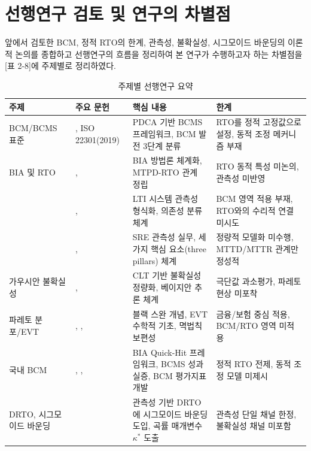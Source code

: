 

\section{선행연구 검토 및 연구의 차별점}
\label{sec:lit-gap}

앞에서 검토한 BCM, 정적 RTO의 한계, 관측성, 불확실성, 시그모이드 바운딩의 이론적 논의를 종합하고 선행연구의 흐름을 정리하여 본 연구가 수행하고자 하는 차별점을 [표 2-8]에 주제별로 정리하였다.


\begin{table}[htbp]
\centering
\caption{주제별 선행연구 요약}
\label{tab:prior-research}
\small
\begin{tabularx}{\textwidth}{@{}>{\raggedright\arraybackslash}p{1.8cm}
  >{\raggedright\arraybackslash}p{3.0cm}
  >{\raggedright\arraybackslash}X
  >{\raggedright\arraybackslash}p{4.0cm}@{}}
\toprule
\textbf{주제} & \textbf{주요 문헌} & \textbf{핵심 내용} & \textbf{한계} \\
\midrule
BCM/BCMS 표준 &
\citet{herbane2010disaster}, ISO 22301(2019) &
PDCA 기반 BCMS 프레임워크, BCM 발전 3단계 분류 &
RTO를 정적 고정값으로 설정, 동적 조정 메커니즘 부재 \\
\addlinespace
BIA 및 RTO &
\citet{snedaker2013bcdr}, \citet{hiles2010bcm} &
BIA 방법론 체계화, MTPD-RTO 관계 정립 &
RTO 동적 특성 미논의, 관측성 미반영 \\
\addlinespace
\m{관측성(제어 이론)} &
\citet{kalman1960control}, \citet{avizienis2004basic} &
LTI 시스템 관측성 형식화, 의존성 분류 체계 &
BCM 영역 적용 부재, RTO와의 수리적 연결 미시도 \\
\addlinespace
\m{관측성(IT 운영)} &
\citet{beyer2016sre}, \citet{majors2022observability} &
SRE 관측성 실무, 세 가지 핵심 요소(three pillars) 체계 &
정량적 모델화 미수행, MTTD/MTTR 관계만 정성적 \\
\addlinespace
가우시안 불확실성 &
\citet{jaynes2003probability}, \citet{gelman2013bayesian} &
CLT 기반 불확실성 정량화, 베이지안 추론 체계 &
극단값 과소평가, 파레토 현상 미포착 \\
\addlinespace
파레토 분포/EVT &
\citet{taleb2007blackswan}, \citet{embrechts1997extremal}, \citet{newman2005powerlaws} &
블랙 스완 개념, EVT 수학적 기초, 멱법칙 보편성 &
금융/보험 중심 적용, BCM/RTO 영역 미적용 \\
\addlinespace
국내 BCM &
\citet{cheung2019quickhit}, \citet{jang2021bcms}, \citet{jung2023bcms} &
BIA Quick-Hit 프레임워크, BCMS 성과 실증, BCM 평가지표 개발 &
정적 RTO 전제, 동적 조정 모델 미제시 \\
\addlinespace
DRTO, 시그모이드 바운딩 &
\citet{lee2026drto} &
관측성 기반 DRTO에 시그모이드 바운딩 도입, 곡률 매개변수 $\kappa^*$ 도출 &
관측성 단일 채널 한정, 불확실성 채널 미포함 \\
\bottomrule
\end{tabularx}
\end{table}

